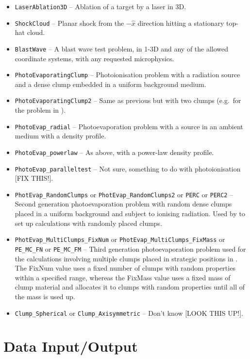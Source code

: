 \documentclass[a4paper,11pt]{report}
\begin{document}
\begin{itemize}
  \item \verb|LaserAblation3D| -- Ablation of a target by a laser in 3D.
  \item \verb|ShockCloud| -- Planar shock from the $-\hat{x}$ direction hitting a stationary top-hat cloud.
  \item \verb|BlastWave| -- A blast wave test problem, in 1-3D and any of the allowed coordinate systems, with any requested microphysics.
  \item \verb|PhotoEvaporatingClump| -- Photoionisation problem with a radiation source and a dense clump embedded in a uniform background medium.
  \item \verb|PhotoEvaporatingClump2| -- Same as previous but with two clumps (e.g.\ for the problem in \citealt{LimMel03}).
  \item \verb|PhotoEvap_radial| -- Photoevaporation problem with a source in an ambient medium with a density profile.
  \item \verb|PhotoEvap_powerlaw| -- As above, with a power-law density profile.
  \item \verb|PhotoEvap_paralleltest| -- Not sure, something to do with photoionisation [FIX THIS!].
  \item \verb|PhotEvap_RandomClumps| or \verb|PhotEvap_RandomClumps2| or \verb|PERC| or \verb|PERC2| -- Second generation photoevaporation problem with random dense clumps placed in a uniform background and subject to ionising radiation.  Used by \citet{MacLim10} to set up calculations with randomly placed clumps.
  \item \verb|PhotEvap_MultiClumps_FixNum| or \verb|PhotEvap_MultiClumps_FixMass| or \verb|PE_MC_FN| or \verb|PE_MC_FM| -- Third generation photoevaporation problem used for the calculations involving multiple clumps placed in strategic positions in \citet{MacLim10,MacLim11b}.  The FixNum value uses a fixed number of clumps with random properties within a specified range, whereas the FixMass value uses a fixed mass of clump material and allocates it to clumps with random properties until all of the mass is used up.
  \item \verb|Clump_Spherical| or \verb|Clump_Axisymmetric| -- Don't know [LOOK THIS UP!].
\end{itemize}


\chapter{Data Input/Output}
\end{document}
